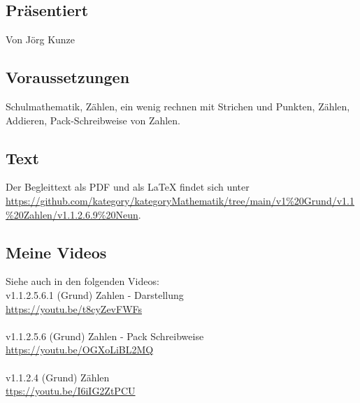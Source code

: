 \documentclass[a4paper]{amsart}
\theoremstyle{definition}
\begin{document}
\subsection*{Präsentiert}
Von Jörg Kunze

\subsection*{Voraussetzungen}
Schulmathematik, Zählen, ein wenig rechnen mit Strichen und Punkten, Zählen, Addieren, Pack-Schreibweise von Zahlen.

\subsection*{Text}
Der Begleittext als PDF und als LaTeX findet sich unter
\url{https://github.com/kategory/kategoryMathematik/tree/main/v1%20Grund/v1.1%20Zahlen/v1.1.2.6.9%20Neun}.

\subsection*{Meine Videos}
Siehe auch in den folgenden Videos:\\
v1.1.2.5.6.1 (Grund) Zahlen - Darstellung\\
\url{https://youtu.be/t8cyZevFWFs}\\
\\
v1.1.2.5.6 (Grund) Zahlen - Pack Schreibweise\\
\url{https://youtu.be/OGXoLiBL2MQ}\\
\\
v1.1.2.4 (Grund) Zählen\\
\url{ttps://youtu.be/I6iIG2ZtPCU}\\
\end{document}
